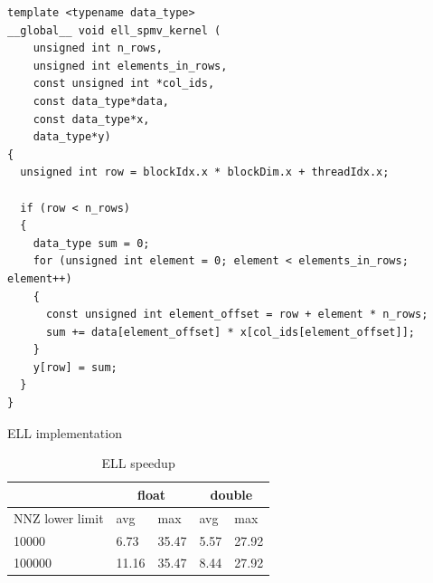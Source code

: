 \documentclass{article}
\begin{document}
\begin{listing}[H]
\begin{verbatim}
template <typename data_type>
__global__ void ell_spmv_kernel (
    unsigned int n_rows,
    unsigned int elements_in_rows,
    const unsigned int *col_ids,
    const data_type*data,
    const data_type*x,
    data_type*y)
{
  unsigned int row = blockIdx.x * blockDim.x + threadIdx.x;

  if (row < n_rows)
  {
    data_type sum = 0;
    for (unsigned int element = 0; element < elements_in_rows; element++)
    {
      const unsigned int element_offset = row + element * n_rows;
      sum += data[element_offset] * x[col_ids[element_offset]];
    }
    y[row] = sum;
  }
}
\end{verbatim}
\caption{ELL implementation}
\label{ell_implementation}
\end{listing}

\begin{table}[H]
	\centering
	\begin{tabular}{ |p{2.6cm}||p{1cm}|p{1cm}|p{1cm}|p{1cm}|  }
	 \hline
		& \multicolumn{2}{|c|}{float} & \multicolumn{2}{|c|}{double}\\
	 \hline
	 NNZ lower limit & avg & max & avg & max  \\
	 \hline
	 10000  & 6.73  & 35.47 & 5.57 & 27.92 \\
	 100000 & 11.16 & 35.47 & 8.44 & 27.92 \\
	 \hline
	\end{tabular}
	\caption{ELL speedup}
  \label{csr_ell_speedup_table}
\end{table}

\begin{figure}[H]
\centering
{}
\qquad %
\end{figure}
\end{document}
